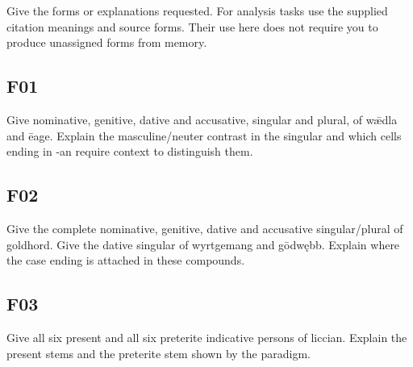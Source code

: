Give the forms or explanations requested. For analysis tasks use the supplied citation meanings and source forms. Their use here does not require you to produce unassigned forms from memory.

\par\begin{minipage}{\linewidth}\raggedright
\subsection*{F01}

Give nominative, genitive, dative and accusative, singular and plural, of wǣdla and ēage. Explain the masculine/\allowbreak{}neuter contrast in the singular and which cells ending in -an require context to distinguish them.

\end{minipage}\par\addvspace{4pt}

\par\begin{minipage}{\linewidth}\raggedright
\subsection*{F02}

Give the complete nominative, genitive, dative and accusative singular/\allowbreak{}plural of goldhord. Give the dative singular of wyrtgemang and gōdwębb. Explain where the case ending is attached in these compounds.

\end{minipage}\par\addvspace{4pt}

\par\begin{minipage}{\linewidth}\raggedright
\subsection*{F03}

Give all six present and all six preterite indicative persons of liccian. Explain the present stems and the preterite stem shown by the paradigm.

\end{minipage}\par\addvspace{4pt}

